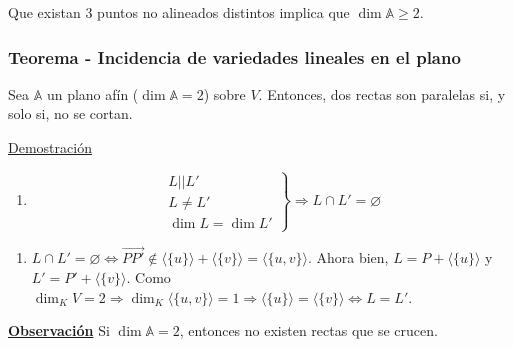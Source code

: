 \documentclass[12pt, a4paper, ones, notitlepage, openany,titlepage]{article}
\newcommand{\observacion}{\noindent\underline{\textbf{Observación}}}
\begin{document}
\noindent Que existan 3 puntos no alineados distintos implica que $\dim \mathbb{A} \ge 2$.

\subsubsection{Teorema - Incidencia de variedades lineales en el plano}
Sea $\mathbb{A}$ un plano afín ($\dim \mathbb{A} = 2$) sobre $V$. Entonces, dos rectas son paralelas si, y solo si, no se cortan.

\noindent\underline{Demostración}
\begin{enumerate}[label=$\Longrightarrow/$]
	\item $$
	\left. \begin{array}{r}
		L || L' \\
		L \neq L' \\
		\dim L = \dim L'
	\end{array} \right\} \Longrightarrow L \cap L' = \varnothing
	$$
\end{enumerate}
\begin{enumerate}[label=$\Longleftarrow/$]
	\item $L \cap L' = \varnothing \Longleftrightarrow \overrightarrow{PP'} \notin \langle\{u\}\rangle + \langle\{v\}\rangle = \langle\{u,v\}\rangle$. Ahora bien, $L = P + \langle\{u\}\rangle$ y $L' = P' + \langle\{v\}\rangle$. Como $\dim_K V = 2 \Longrightarrow \dim_K \langle\{u,v\}\rangle = 1 \Longrightarrow \langle\{u\}\rangle = \langle\{v\}\rangle \Longleftrightarrow L = L'$.
\end{enumerate}
\observacion
\noindent Si $\dim \mathbb{A} = 2$, entonces no existen rectas que se crucen.
\end{document}
